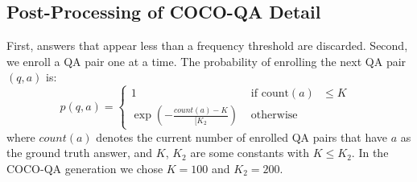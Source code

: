 \documentclass{article} \usepackage{nips15submit_e,times}
\renewcommand{\#}[1]{\textbf{#1}}
\begin{document}
\subsection{Post-Processing of COCO-QA Detail}
\label{app:post_process}
First, answers that appear less than a frequency threshold are discarded.
Second, we enroll a QA pair one at a time.  The probability of enrolling the
next QA pair $(q, a)$ is:
\begin{equation}
p(q, a) = \left\{ \begin{array}{cl}
1 &\mbox{ if count$(a)$ $\le K$ } \\
\exp\left(-\frac{count(a) - K}{[K_2}\right) &\mbox{ otherwise }
\end{array} \right.
\end{equation}
where $count(a)$ denotes the current number of enrolled QA pairs that have $a$
as the ground truth answer, and $K$, $K_2$ are some constants with $K \le K_2$.
In the COCO-QA generation we chose $K = 100$ and $K_2 = 200$. 

\clearpage
\end{document}
